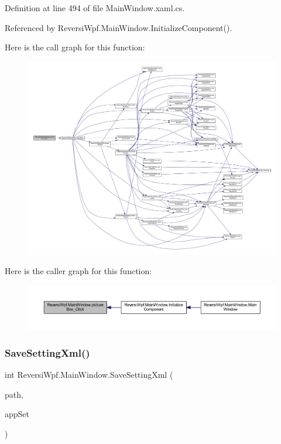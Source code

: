 Definition at line 494 of file Main\+Window.\+xaml.\+cs.



Referenced by Reversi\+Wpf.\+Main\+Window.\+Initialize\+Component().

Here is the call graph for this function\+:
\nopagebreak
\begin{figure}[H]
\begin{center}
\leavevmode
\includegraphics[width=350pt]{class_reversi_wpf_1_1_main_window_a7514a29baed5a572e78354addb9678bc_cgraph}
\end{center}
\end{figure}
Here is the caller graph for this function\+:
\nopagebreak
\begin{figure}[H]
\begin{center}
\leavevmode
\includegraphics[width=350pt]{class_reversi_wpf_1_1_main_window_a7514a29baed5a572e78354addb9678bc_icgraph}
\end{center}
\end{figure}
\mbox{\label{class_reversi_wpf_1_1_main_window_a02e0ae28907a572eca49167b37ce7db9}} 
\subsubsection{\texorpdfstring{Save\+Setting\+Xml()}{SaveSettingXml()}}
{\footnotesize\ttfamily int Reversi\+Wpf.\+Main\+Window.\+Save\+Setting\+Xml (\begin{DoxyParamCaption}\item[{string}]{path,  }\item[{ref \hyperlink{class_reversi_wpf_1_1_reversi_setting}{Reversi\+Setting}}]{app\+Set }\end{DoxyParamCaption})}



